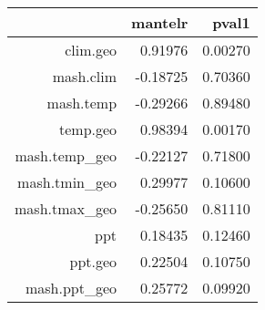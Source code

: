 \begin{table}[ht]
\centering
\begin{tabular}{rrr}
  \hline
 & mantelr & pval1 \\ 
  \hline
clim.geo & 0.91976 & 0.00270 \\ 
  mash.clim & -0.18725 & 0.70360 \\ 
  mash.temp & -0.29266 & 0.89480 \\ 
  temp.geo & 0.98394 & 0.00170 \\ 
  mash.temp\_geo & -0.22127 & 0.71800 \\ 
  mash.tmin\_geo & 0.29977 & 0.10600 \\ 
  mash.tmax\_geo & -0.25650 & 0.81110 \\ 
  ppt & 0.18435 & 0.12460 \\ 
  ppt.geo & 0.22504 & 0.10750 \\ 
  mash.ppt\_geo & 0.25772 & 0.09920 \\ 
   \hline
\end{tabular}
\end{table}
